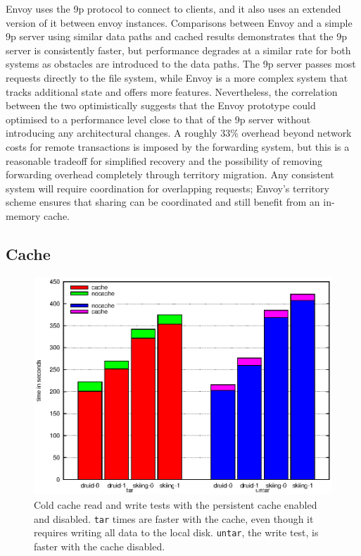 Envoy uses the 9p protocol to connect to clients, and it also uses an extended version of it between envoy instances. Comparisons between Envoy and a simple 9p server using similar data paths and cached results demonstrates that the 9p server is consistently faster, but performance degrades at a similar rate for both systems as obstacles are introduced to the data paths. The 9p server passes most requests directly to the file system, while Envoy is a more complex system that tracks additional state and offers more features. Nevertheless, the correlation between the two optimistically suggests that the Envoy prototype could optimised to a performance level close to that of the 9p server without introducing any architectural changes. A roughly 33\% overhead beyond network costs for remote transactions is imposed by the forwarding system, but this is a reasonable tradeoff for simplified recovery and the possibility of removing forwarding overhead completely through territory migration. Any consistent system will require coordination for overlapping requests; Envoy's territory scheme ensures that sharing can be coordinated and still benefit from an in-memory cache.

\subsection{Cache}

\begin{figure}[t]
\centering
\includegraphics[width=\figwidth]{figures/envoy-cold-vs-nocache}
\caption[Cold cache results with and without persistent cache]{Cold cache read and write tests with the persistent cache enabled and disabled. \texttt{tar} times are faster with the cache, even though it requires writing all data to the local disk. \texttt{untar}, the write test, is faster with the cache disabled.}
\label{fig:envoy-cold-vs-nocache}
\end{figure}

